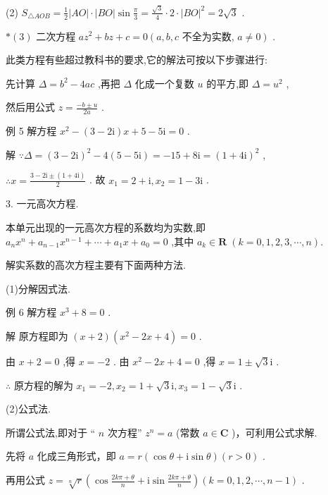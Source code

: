 \documentclass[10pt]{article}
\begin{document}
(2) \({S}_{\bigtriangleup {AOB}} = \frac{1}{2}\left| {AO}\right|  \cdot  \left| {BO}\right| \sin \frac{\pi }{3} = \frac{\sqrt{3}}{4} \cdot  2 \cdot  {\left| BO\right| }^{2} = 2\sqrt{3}\) .

\(* \left( 3\right)\) 二次方程 \(a{z}^{2} + {bz} + c = 0\left( {a,b,c}\right.\) 不全为实数, \(\left. {a \neq  0}\right)\) .

此类方程有些超过教科书的要求,它的解法可按以下步骤进行:

先计算 \(\Delta  = {b}^{2} - {4ac}\) ,再把 \(\Delta\) 化成一个复数 \(u\) 的平方,即 \(\Delta  = {u}^{2}\) ,

然后用公式 \(z = \frac{-b \pm  u}{2a}\) .

例 5 解方程 \({x}^{2} - \left( {3 - 2\mathrm{i}}\right) x + 5 - 5\mathrm{i} = 0\) .

解 \(\because \Delta  = {\left( 3 - 2\mathrm{i}\right) }^{2} - 4\left( {5 - 5\mathrm{i}}\right)  =  - {15} + 8\mathrm{i} = {\left( 1 + 4\mathrm{i}\right) }^{2}\) ,

\(\therefore x = \frac{3 - 2\mathrm{i} \pm  \left( {1 + 4\mathrm{i}}\right) }{2}\) . 故 \({x}_{1} = 2 + \mathrm{i},{x}_{2} = 1 - 3\mathrm{i}\) .

3. 一元高次方程.

本单元出现的一元高次方程的系数均为实数,即 \({a}_{n}{x}^{n} + {a}_{n - 1}{x}^{n - 1} + \cdots  + {a}_{1}x + {a}_{0} = 0\) ,其中 \({a}_{k} \in  \mathbf{R}\;\left( {k = 0,1,2,3,\cdots ,n}\right) .\)

解实系数的高次方程主要有下面两种方法.

(1)分解因式法.

例 6 解方程 \({x}^{3} + 8 = 0\) .

解 原方程即为 \(\left( {x + 2}\right) \left( {{x}^{2} - {2x} + 4}\right)  = 0\) .

由 \(x + 2 = 0\) ,得 \(x =  - 2\) . 由 \({x}^{2} - {2x} + 4 = 0\) ,得 \(x = 1 \pm  \sqrt{3}\mathrm{i}\) .

\(\therefore\) 原方程的解为 \({x}_{1} =  - 2,{x}_{2} = 1 + \sqrt{3}\mathrm{i},{x}_{3} = 1 - \sqrt{3}\mathrm{i}\) .

(2)公式法.

所谓公式法,即对于 “ \(n\) 次方程” \({z}^{n} = a\) (常数 \(a \in  \mathbf{C}\) )，可利用公式求解.

先将 \(a\) 化成三角形式，即 \(a = r\left( {\cos \theta  + \mathrm{i}\sin \theta }\right) \left( {r > 0}\right)\) .

再用公式 \(z = \sqrt[n]{r}\left( {\cos \frac{{2k\pi } + \theta }{n} + \mathrm{i}\sin \frac{{2k\pi } + \theta }{n}}\right) \left( {k = 0,1,2,\cdots ,n - 1}\right)\) .
\end{document}
